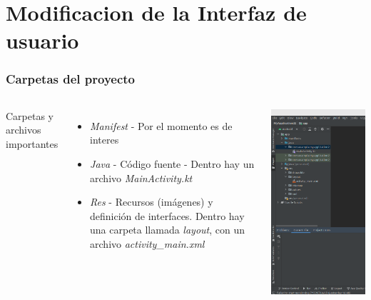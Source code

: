 \section{Modificacion de la Interfaz de usuario}


\begin{frame}
\frametitle{Carpetas del proyecto}
\begin{columns}
Carpetas y archivos importantes
\begin{itemize}
\item \textit{Manifest} - Por el momento es de interes
\item \textit{Java} - C\'odigo fuente - Dentro hay un archivo \textit{MainActivity.kt}
\item \textit{Res} - Recursos (im\'agenes) y definici\'on de interfaces. Dentro hay una carpeta llamada \textit{layout}, con un archivo \textit{activity\_main.xml}
\end{itemize}
\begin{center}
\includegraphics[width=0.95\linewidth]{00_Modificacion/PanelCarpetas.png}    

\end{center}
\end{columns}
\end{frame}
